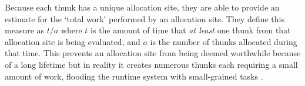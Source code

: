 Because each thunk has a unique allocation site, they are able to provide an
estimate for the `total work' performed by an allocation site. They define this
measure as $t/a$ where $t$ is the amount of time that \emph{at least} one thunk
from that allocation site is being evaluated, and $a$ is the number of thunks
allocated during that time.  This prevents an allocation site from being deemed
worthwhile because of a long lifetime but in reality it creates numerous thunks
each requiring a small amount of work, flooding the runtime system with
small-grained tasks \citep[Section 3]{feedbackImplicit}.
